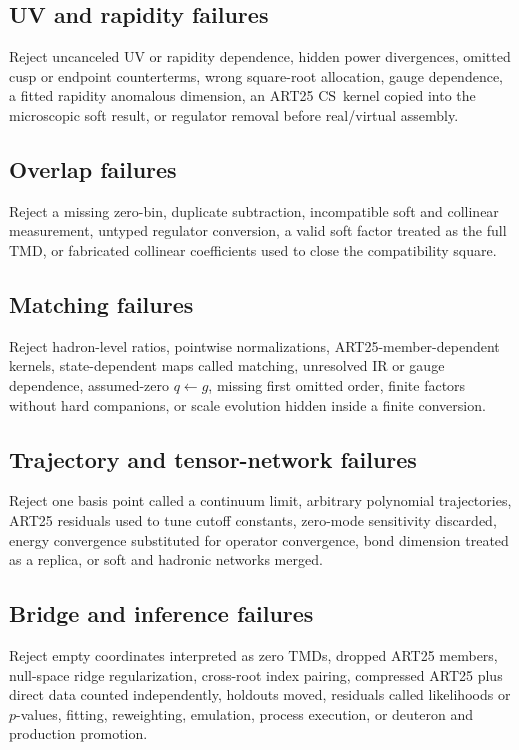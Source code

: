 \documentclass[11pt]{article}
\newcommand{\TMD}{\ensuremath{\mathrm{TMD}}}
\newcommand{\CS}{\ensuremath{\mathrm{CS}}}
\begin{document}
\subsection{UV and rapidity failures}

Reject uncanceled UV or rapidity dependence, hidden power divergences, omitted cusp or endpoint counterterms, wrong square-root allocation, gauge dependence, a fitted rapidity anomalous dimension, an ART25 \CS\ kernel copied into the microscopic soft result, or regulator removal before real/virtual assembly.

\subsection{Overlap failures}

Reject a missing zero-bin, duplicate subtraction, incompatible soft and collinear measurement, untyped regulator conversion, a valid soft factor treated as the full \TMD, or fabricated collinear coefficients used to close the compatibility square.

\subsection{Matching failures}

Reject hadron-level ratios, pointwise normalizations, ART25-member-dependent kernels, state-dependent maps called matching, unresolved IR or gauge dependence, assumed-zero \(q\leftarrow g\), missing first omitted order, finite factors without hard companions, or scale evolution hidden inside a finite conversion.

\subsection{Trajectory and tensor-network failures}

Reject one basis point called a continuum limit, arbitrary polynomial trajectories, ART25 residuals used to tune cutoff constants, zero-mode sensitivity discarded, energy convergence substituted for operator convergence, bond dimension treated as a replica, or soft and hadronic networks merged.

\subsection{Bridge and inference failures}

Reject empty coordinates interpreted as zero TMDs, dropped ART25 members, null-space ridge regularization, cross-root index pairing, compressed ART25 plus direct data counted independently, holdouts moved, residuals called likelihoods or \(p\)-values, fitting, reweighting, emulation, process execution, or deuteron and production promotion.
\end{document}

